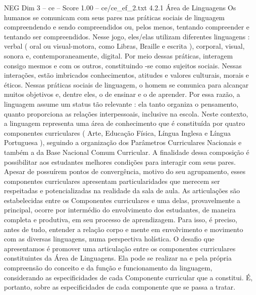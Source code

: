 \begin{textsample}{NEG Dim 3 – ce – Score 1.00 – ce/ce\_ef\_2.txt}  \label{ex:f3_neg_240}
4.2.1 Área de Linguagens Os humanos se comunicam com seus pares nas práticas sociais de linguagem compreendendo e sendo compreendidos ou, pelos menos, tentando compreender e tentando ser compreendidos.
Nesse jogo, eles/elas utilizam diferentes linguagens : verbal ( oral ou visual-motora, como Libras, Braille e escrita ), corporal, visual, sonora e, contemporaneamente, digital.
Por meio dessas práticas, interagem consigo mesmos e com os outros, constituindo -se como sujeitos sociais.
Nessas interações, estão imbricados conhecimentos, atitudes e valores culturais, morais e éticos.
Nessas práticas sociais de linguagem, o homem se comunica para alcançar muitos objetivos e, dentre eles, o de ensinar e o de aprender.
Por essa razão, a linguagem assume um status tão relevante : ela tanto organiza o pensamento, quanto proporciona as relações interpessoais, inclusive na escola.
Neste contexto, a linguagem representa uma área de conhecimento que é constituída por quatro componentes curriculares ( Arte, Educação Física, Língua Inglesa e Língua Portuguesa ), seguindo a organização dos Parâmetros Curriculares Nacionais e também a da Base Nacional Comum Curricular.
A finalidade dessa composição é possibilitar aos estudantes melhores condições para interagir com seus pares.
Apesar de possuírem pontos de convergência, motivo do seu agrupamento, esses componentes curriculares apresentam particularidades que merecem ser respeitadas e potencializadas na realidade da sala de aula.
As articulações são estabelecidas entre os Componentes curriculares e uma delas, provavelmente a principal, ocorre por intermédio do envolvimento dos estudantes, de maneira completa e produtiva, em seu processo de aprendizagem.
Para isso, é preciso, antes de tudo, entender a relação corpo e mente em envolvimento e movimento com as diversas linguagens, numa perspectiva holística.
O desafio que apresentamos é promover uma articulação entre os componentes curriculares constituintes da Área de Linguagens.
Ela pode se realizar na e pela própria compreensão do conceito e da função e funcionamento da linguagem, considerando as especificidades de cada Componente curricular que a constitui.
É, portanto, sobre as especificidades de cada componente que se passa a tratar.

\end{textsample}
